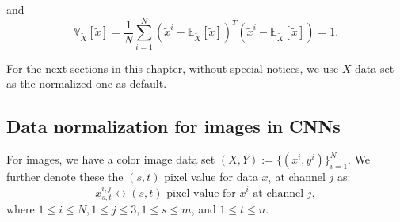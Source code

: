 and 
\begin{equation}\label{key}
\mathbb{V}_{\tilde X}[\tilde x] = \frac{1}{N} \sum_{i=1}^N (\tilde x^i - \mathbb{E}_{\tilde X}[\tilde x] )^T (\tilde x^i - \mathbb{E}_{\tilde X}[\tilde x] )= 1.
\end{equation}

For the next sections in this chapter, without special notices, we use $X$ data set
as the normalized one as default. 


\subsection{Data normalization for images in CNNs}
For images, we have a color image data set $(X,Y) := \{(x^i, y^i)\}_{i=1}^N$.
We further denote these the $(s,t)$ pixel value for data $x_i$ at channel $j$ as:
\begin{equation}\label{key}
x^{i,j}_{s,t} \longleftrightarrow (s,t) \text{ pixel value for } x^i \text{ at channel } j,
\end{equation}
where $1\le i \le N, 1\le j\le 3, 1\le s \le m$, and  $1\le t\le n$.

